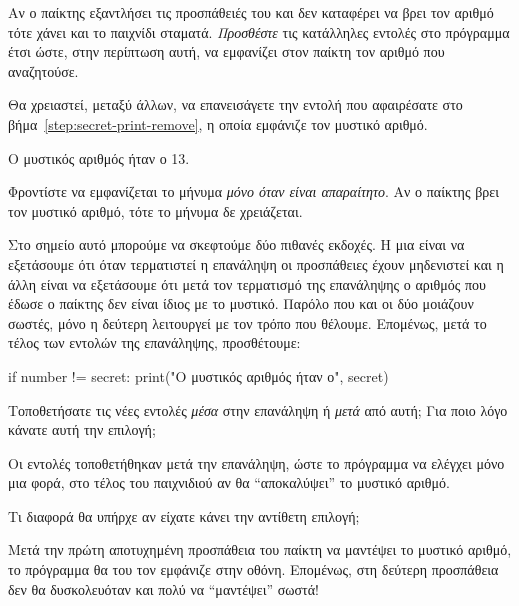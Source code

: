 \documentclass[a4paper,11pt,oneside]{book}
\begin{document}
\begin{step}
Αν ο παίκτης εξαντλήσει τις προσπάθειές του και δεν καταφέρει να βρει τον αριθμό τότε χάνει και το παιχνίδι σταματά. \emph{Προσθέστε} τις κατάλληλες εντολές στο πρόγραμμα έτσι ώστε, στην περίπτωση αυτή, να εμφανίζει στον παίκτη τον αριθμό που αναζητούσε.

\begin{note}
Θα χρειαστεί, μεταξύ άλλων, να επανεισάγετε την εντολή που αφαιρέσατε στο βήμα~\ref{step:secret-print-remove}, η οποία εμφάνιζε τον μυστικό αριθμό.
\end{note} 

\marginnote[14pt]{\iconcomputer}
\begin{pyterm}
Ο μυστικός αριθμός ήταν ο 13.
\end{pyterm}

Φροντίστε να εμφανίζεται το μήνυμα \emph{μόνο όταν είναι απαραίτητο}. Αν ο παίκτης βρει τον μυστικό αριθμό, τότε το μήνυμα δε χρειάζεται.

\begin{answer}
Στο σημείο αυτό μπορούμε να σκεφτούμε δύο πιθανές εκδοχές. Η μια είναι να εξετάσουμε ότι όταν τερματιστεί η επανάληψη οι προσπάθειες έχουν μηδενιστεί και η άλλη είναι να εξετάσουμε ότι μετά τον τερματισμό της επανάληψης ο αριθμός που έδωσε ο παίκτης δεν είναι ίδιος με το μυστικό. Παρόλο που και οι δύο μοιάζουν σωστές, μόνο η δεύτερη λειτουργεί με τον τρόπο που θέλουμε. Επομένως, μετά το τέλος των εντολών της επανάληψης, προσθέτουμε: 
	
\begin{pynew}
if number != secret: 
    print("Ο μυστικός αριθμός ήταν ο", secret)
\end{pynew}
\end{answer}

Τοποθετήσατε τις νέες εντολές \emph{μέσα} στην επανάληψη ή \emph{μετά} από αυτή; Για ποιο λόγο κάνατε αυτή την επιλογή;

\begin{answer}
Οι εντολές τοποθετήθηκαν μετά την επανάληψη, ώστε το πρόγραμμα να ελέγχει μόνο μια φορά, στο τέλος του παιχνιδιού αν θα ``αποκαλύψει'' το μυστικό αριθμό.
\end{answer}

Τι διαφορά θα υπήρχε αν είχατε κάνει την αντίθετη επιλογή;

\begin{answer}
Μετά την πρώτη αποτυχημένη προσπάθεια του παίκτη να μαντέψει το μυστικό αριθμό, το πρόγραμμα θα του τον εμφάνιζε στην οθόνη. Επομένως, στη δεύτερη προσπάθεια δεν θα δυσκολευόταν και πολύ να ``μαντέψει'' σωστά!
\end{answer}


\end{step}
\end{document}
